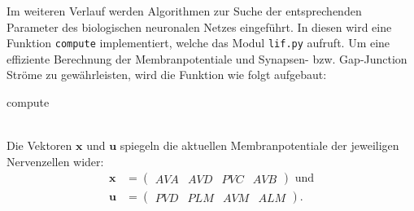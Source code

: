 	Im weiteren Verlauf werden Algorithmen zur Suche der entsprechenden Parameter des biologischen neuronalen Netzes eingeführt. In diesen wird eine Funktion \texttt{compute} implementiert, welche das Modul \texttt{lif.py} aufruft. Um eine effiziente Berechnung der Membranpotentiale und Synapsen- bzw. Gap-Junction Ströme zu gewährleisten, wird die Funktion wie folgt aufgebaut:
	\begin{algorithm}
		
		
		\caption{compute}
	\end{algorithm}\\
	Die Vektoren $\boldsymbol{x}$ und $\boldsymbol{u}$ spiegeln die aktuellen Membranpotentiale der jeweiligen Nervenzellen wider:
	\begin{align}
		\boldsymbol{x} &= \begin{pmatrix}AVA & AVD & PVC & AVB\end{pmatrix}\text{ und}\\
		\boldsymbol{u} &= \begin{pmatrix}PVD & PLM & AVM & ALM\end{pmatrix}\text{.}
		\label{eq:xu}
	\end{align}
